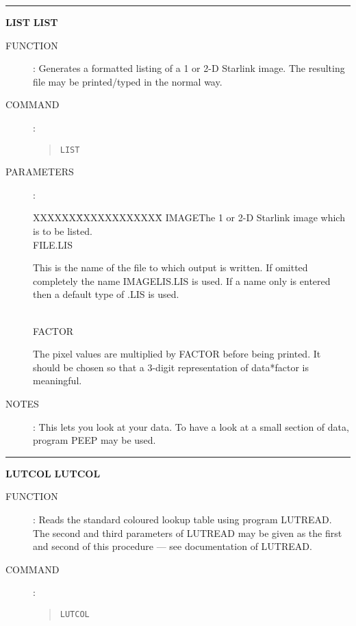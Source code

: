 \goodbreak
\rule{\textwidth}{0.3mm}
{\Large {\bf LIST} \hfill {\bf LIST}}
\begin{description}
\item [FUNCTION]:
Generates a formatted listing of a 1 or 2-D Starlink image.
The resulting file may be printed/typed in the normal way.
\item [COMMAND]:
\begin{quote}
{\tt LIST}
\end{quote}
\item [PARAMETERS] :
\begin{tabbing}
XXXXXX\=XXXXXXXXXXXX\=\kill
IMAGE\>\>The 1 or 2-D  Starlink image which is to be listed.\\
FILE\>[IMAGELIS].LIS\>\begin{minipage}[t]{100mm}
This is the name of the file to which output is written.
If omitted completely the name IMAGELIS.LIS is used.
If a name only is entered then a default type of .LIS is used.
\end{minipage}\\          
FACTOR\>\begin{minipage}[t]{100mm}
The pixel values are multiplied by FACTOR before being printed.
It should be chosen so that a 3-digit representation of data*factor is
meaningful.
\end{minipage}
\end{tabbing}
\item [NOTES]:
This lets you look at your data.
To have a look at a small section of data, program PEEP may be used.
\end{description}

\goodbreak
\rule{\textwidth}{0.3mm}
{\Large {\bf LUTCOL} \hfill {\bf LUTCOL}}
\begin{description}
\item [FUNCTION]:
Reads the standard coloured lookup table using program LUTREAD.
The second and third parameters of LUTREAD may be given as the first and
second of this procedure --- see documentation of LUTREAD.
\item [COMMAND]:
\begin{quote}
{\tt LUTCOL}
\end{quote}
\end{description}


